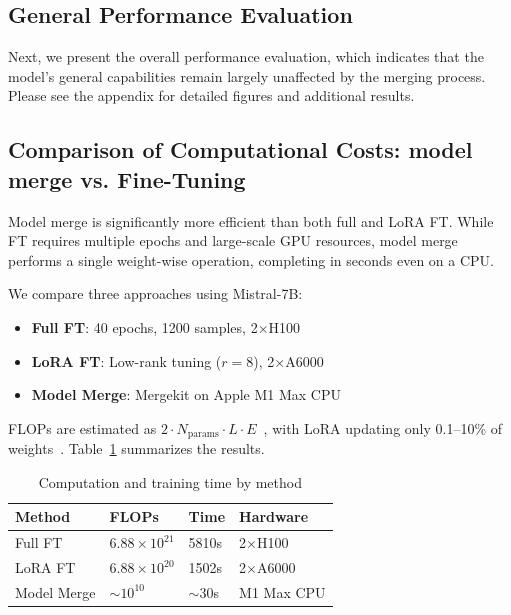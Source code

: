 \documentclass[conference,compsoc]{IEEEtran}
\begin{document}
\subsection{General Performance Evaluation}
Next, we present the overall performance evaluation, which indicates that the model’s general capabilities remain largely unaffected by the merging process. Please see the appendix for detailed figures and additional results.

\subsection{Comparison of Computational Costs: model merge vs. Fine-Tuning}
Model merge is significantly more efficient than both full and LoRA FT. While FT requires multiple epochs and large-scale GPU resources, model merge performs a single weight-wise operation, completing in seconds even on a CPU.

We compare three approaches using Mistral-7B:
\begin{itemize}
    \item \textbf{Full FT}: 40 epochs, 1200 samples, 2$\times$H100
    \item \textbf{LoRA FT}: Low-rank tuning ($r{=}8$), 2$\times$A6000
    \item \textbf{Model Merge}: Mergekit on Apple M1 Max CPU
\end{itemize}

FLOPs are estimated as $2 \cdot N_{\text{params}} \cdot L \cdot E$~\cite{kaplan2020scaling}, with LoRA updating only 0.1–10\% of weights~\cite{hu2021lora,dettmers2023qlora}. Table~\ref{tab:flops_compare1} summarizes the results.

\begin{table}[ht]
\centering
\caption{Computation and training time by method}
\label{tab:flops_compare1}
\begin{tabular}{l|l|l|l}
\hline\hline
\textbf{Method} & \textbf{FLOPs} & \textbf{Time} & \textbf{Hardware} \\
\hline
Full FT & $6.88\!\times\!10^{21}$ & 5810s & 2$\times$H100 \\
LoRA FT & $6.88\!\times\!10^{20}$ & 1502s & 2$\times$A6000 \\
Model Merge   & $\sim\!10^{10}$         & $\sim$30s & M1 Max CPU \\
\hline\hline
\end{tabular}
\end{table}
\end{document}
